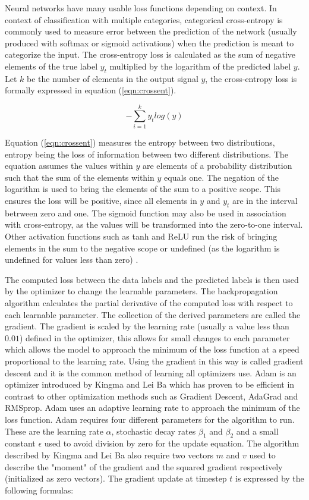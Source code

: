 Neural networks have many usable loss functions depending on context. In context of classification with multiple categories, categorical cross-entropy is commonly used to measure error between the prediction of the network (usually produced with softmax or sigmoid activations) when the prediction is meant to categorize the input. The cross-entropy loss is calculated as the sum of negative elements of the true label $y_t$ multiplied by the logarithm of the predicted label $y$. Let $k$ be the number of elements in the output signal $y$, the cross-entropy loss is formally expressed in equation (\ref{eqn:crossent}).

\begin{equation}
\label{eqn:crossent}
-\sum_{i=1}^k y_t log(y)
\end{equation}

Equation (\ref{eqn:crossent}) measures the entropy between two distributions, entropy being the loss of information between two different distributions. The equation assumes the values within $y$ are elements of a probability distribution such that the sum of the elements within $y$ equals one. The negation of the logarithm is used to bring the elements of the sum to a positive scope. This ensures the loss will be positive, since all elements in $y$ and $y_t$ are in the interval betrween zero and one. The sigmoid function may also be used in association with cross-entropy, as the values will be transformed into the zero-to-one interval. Other activation functions such as tanh and ReLU run the risk of bringing elements in the sum to the negative scope or undefined (as the logarithm is undefined for values less than zero) \cite{krippendorff2009mathematical, shannon2001mathematical}.

The computed loss between the data labels and the predicted labels is then used by the optimizer to change the learnable parameters. The backpropagation algorithm calculates the partial derivative of the computed loss with respect to each learnable parameter. The collection of the derived parameters are called the gradient. The gradient is scaled by the learning rate (usually a value less than $0.01$) defined in the optimizer, this allows for small changes to each parameter which allows the model to approach the minimum of the loss function at a speed proportional to the learning rate. Using the gradient in this way is called gradient descent and it is the common method of learning all optimizers use. Adam is an optimizer introduced by Kingma and Lei Ba \cite{kingma2014adam} which has proven to be efficient in contrast to other optimization methods such as Gradient Descent, AdaGrad and RMSprop. Adam uses an adaptive learning rate to approach the minimum of the loss function. Adam requires four different parameters for the algorithm to run. These are the learning rate $\alpha$, stochastic decay rates $\beta_1$ and $\beta_2$ and a small constant $\epsilon$ used to avoid division by zero for the update equation. The algorithm described by Kingma and Lei Ba also require two vectors $m$ and $v$ used to describe the "moment" of the gradient and the squared gradient respectively (initialized as zero vectors). The gradient update at timestep $t$ is expressed by the following formulas:

